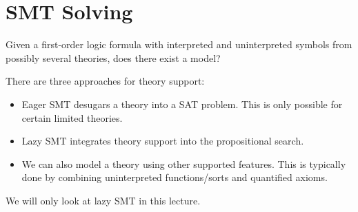 \section{SMT Solving}
\begin{mytitle} Given a first-order logic formula with interpreted and uninterpreted symbols from possibly several theories, does there exist a model?
\end{mytitle}
\begin{mytitle} There are three approaches for theory support:
\begin{itemize}
    \item Eager SMT desugars a theory into a SAT problem. This is only possible for certain limited theories.
    \item Lazy SMT integrates theory support into the propositional search.
    \item We can also model a theory using other supported features. This is typically done by combining uninterpreted functions/sorts and quantified axioms.
\end{itemize}
We will only look at lazy SMT in this lecture.
\end{mytitle}

